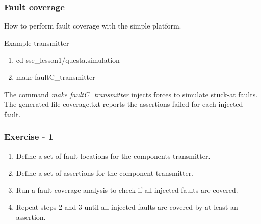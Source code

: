 \documentclass{beamer}
\begin{document}
\begin{frame}

\frametitle{Fault coverage}

How to perform fault coverage with the simple platform.
\begin{block}{Example transmitter}
	\begin{enumerate}
		\item 
		cd sse\_lesson1/questa.simulation
		\item
		make faultC\_transmitter
	\end{enumerate}
\end{block}

The command \textit{make faultC\_transmitter} injects forces to 
simulate stuck-at faults. The generated file coverage.txt reports the assertions 
failed for each injected fault.

\end{frame}

\begin{frame}

\frametitle{Exercise - 1}

\begin{enumerate}
	\item 
	Define a set of fault locations for the components transmitter.
	\item
	Define a set of assertions for the component transmitter.
	\item
	Run a fault coverage analysis to check if all injected faults are covered.
	\item
	Repeat steps 2 and 3 until all injected faults are covered by
	at least an assertion.
	
\end{enumerate}

  
\end{frame}

%
%
%
%
\end{document}
